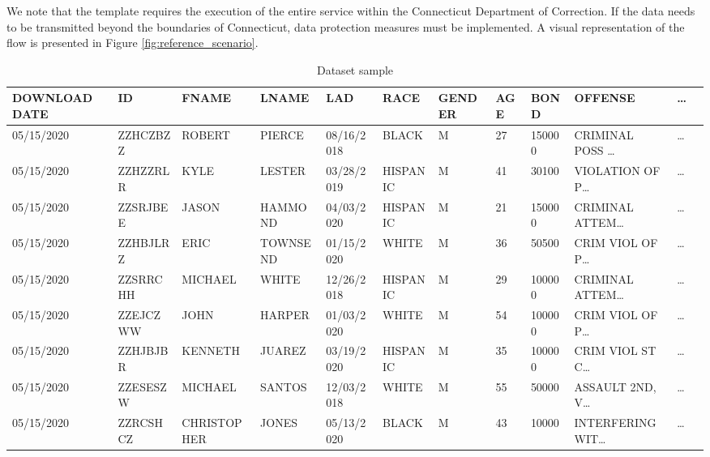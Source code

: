 We note that the template requires the execution of the entire service within the Connecticut Department of Correction.
If the data needs to be transmitted beyond the boundaries of Connecticut, data protection measures must be implemented.
A visual representation of the flow is presented in Figure \ref{fig:reference_scenario}.
\begin{table*}[ht!]
  \caption{Dataset sample}
  \label{tab:dataset}
  \centering
  \begin{adjustbox}{max totalsize={.99\linewidth}{\textheight},center}
    \bgroup
    \def\arraystretch{1.5}
    \begin{tabular}{|l|l|l|l|l|l|l|l|l|l|l|l|}
      \hline
      \textbf{DOWNLOAD DATE} & \textbf{ID} & \textbf{FNAME} & \textbf{LNAME} & \textbf{LAD} & \textbf{RACE} & \textbf{GENDER} & \textbf{AGE} & \textbf{BOND} & \textbf{OFFENSE}     & \textbf{\dots} \\ \hline
      05/15/2020             & ZZHCZBZZ    & ROBERT         & PIERCE         & 08/16/2018   & BLACK         & M               & 27           & 150000        & CRIMINAL POSS \dots  & \dots          \\ \hline
      05/15/2020             & ZZHZZRLR    & KYLE           & LESTER         & 03/28/2019   & HISPANIC      & M               & 41           & 30100         & VIOLATION OF P\dots  & \dots          \\ \hline
      05/15/2020             & ZZSRJBEE    & JASON          & HAMMOND        & 04/03/2020   & HISPANIC      & M               & 21           & 150000        & CRIMINAL ATTEM\dots  & \dots          \\ \hline
      05/15/2020             & ZZHBJLRZ    & ERIC           & TOWNSEND       & 01/15/2020   & WHITE         & M               & 36           & 50500         & CRIM VIOL OF P\dots  & \dots          \\ \hline
      05/15/2020             & ZZSRRCHH    & MICHAEL        & WHITE          & 12/26/2018   & HISPANIC      & M               & 29           & 100000        & CRIMINAL ATTEM\dots  & \dots          \\ \hline
      05/15/2020             & ZZEJCZWW    & JOHN           & HARPER         & 01/03/2020   & WHITE         & M               & 54           & 100000        & CRIM VIOL OF P\dots  & \dots          \\ \hline
      05/15/2020             & ZZHJBJBR    & KENNETH        & JUAREZ         & 03/19/2020   & HISPANIC      & M               & 35           & 100000        & CRIM VIOL ST C\dots  & \dots          \\ \hline
      05/15/2020             & ZZESESZW    & MICHAEL        & SANTOS         & 12/03/2018   & WHITE         & M               & 55           & 50000         & ASSAULT 2ND, V\dots  & \dots          \\ \hline
      05/15/2020             & ZZRCSHCZ    & CHRISTOPHER    & JONES          & 05/13/2020   & BLACK         & M               & 43           & 10000         & INTERFERING WIT\dots & \dots          \\ \hline
    \end{tabular}
    \egroup
  \end{adjustbox}

\end{table*}
